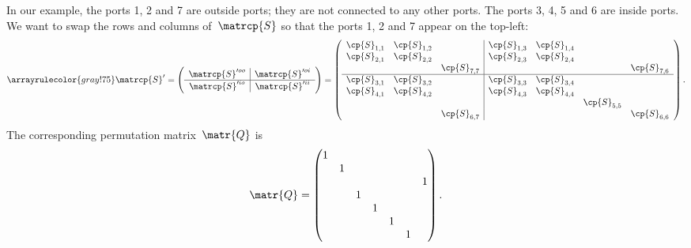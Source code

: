 In our example, the ports 1, 2 and 7 are outside ports; they are not connected to any other ports.
The ports 3, 4, 5 and 6 are inside ports.
We want to swap the rows and columns of~$\matrcp{S}$ so that the ports 1, 2 and 7 appear on the top-left:
\begin{equation}
    \arrayrulecolor{gray!75}
    \matrcp{S}'
    =
    \left(
    \begin{array}{c|c}
        \matrcp{S}'^{oo} & \matrcp{S}'^{oi} \\
        \hline
        \matrcp{S}'^{io} & \matrcp{S}'^{ii} \\
    \end{array}
    \right)
    =
    \left(
    \begin{array}{ccc|cccc}
        \cp{S}_{1,1} & \cp{S}_{1,2} &         & \cp{S}_{1,3} & \cp{S}_{1,4} &         &         \\
        \cp{S}_{2,1} & \cp{S}_{2,2} &         & \cp{S}_{2,3} & \cp{S}_{2,4} &         &         \\
                &         & \cp{S}_{7,7} &         &         &         & \cp{S}_{7,6} \\
                \hline
        \cp{S}_{3,1} & \cp{S}_{3,2} &         & \cp{S}_{3,3} & \cp{S}_{3,4} &         &         \\
        \cp{S}_{4,1} & \cp{S}_{4,2} &         & \cp{S}_{4,3} & \cp{S}_{4,4} &         &         \\
                &         &         &         &         & \cp{S}_{5,5} &         \\
                &         & \cp{S}_{6,7} &         &         &         & \cp{S}_{6,6} \\
    \end{array}
    \right)
    \text{.}
    \label{eq:implementation_4}
\end{equation}
The corresponding permutation matrix~$\matr{Q}$ is
\begin{equation}
    \matr{Q} =
    \begin{pmatrix}
        1  &     &     &     &     &     &     \\
           &  1  &     &     &     &     &     \\
           &     &     &     &     &     &  1  \\
           &     &  1  &     &     &     &     \\
           &     &     &  1  &     &     &     \\
           &     &     &     &  1  &     &     \\
           &     &     &     &     &  1  &     \\
    \end{pmatrix}
    \text{.}
    \label{eq:implementation_5}
\end{equation}


